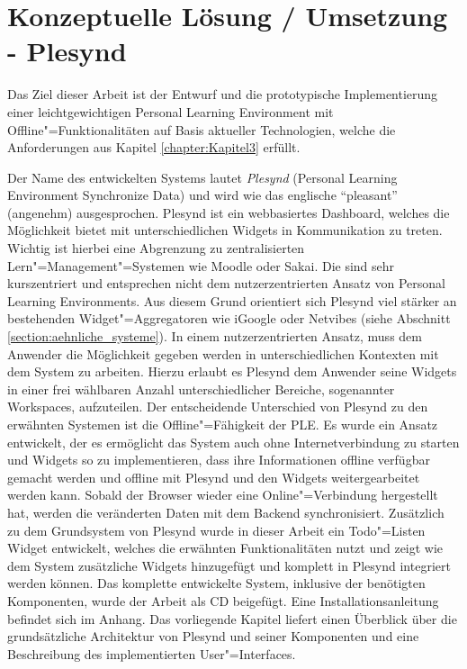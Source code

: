 \chapter{Konzeptuelle Lösung / Umsetzung - Plesynd}\label{chapter:Kapitel5}

Das Ziel dieser Arbeit ist der Entwurf und die prototypische Implementierung einer leichtgewichtigen Personal Learning Environment mit Offline"=Funktionalitäten auf Basis aktueller Technologien, welche die Anforderungen aus Kapitel \ref{chapter:Kapitel3} erfüllt. 

Der Name des entwickelten Systems lautet \emph{Plesynd} (Personal Learning Environment Synchronize Data) und wird wie das englische "`pleasant"' (angenehm) ausgesprochen. Plesynd ist ein webbasiertes Dashboard, welches die Möglichkeit bietet mit unterschiedlichen Widgets in Kommunikation zu treten. Wichtig ist hierbei eine Abgrenzung zu zentralisierten Lern"=Management"=Systemen wie Moodle oder Sakai. Die sind sehr kurszentriert und entsprechen nicht dem nutzerzentrierten Ansatz von Personal Learning Environments. Aus diesem Grund orientiert sich Plesynd viel stärker an bestehenden Widget"=Aggregatoren wie iGoogle oder Netvibes (siehe Abschnitt \ref{section:aehnliche_systeme}). In einem nutzerzentrierten Ansatz, muss dem Anwender die Möglichkeit gegeben werden in unterschiedlichen Kontexten mit dem System zu arbeiten. Hierzu erlaubt es Plesynd dem Anwender seine Widgets in einer frei wählbaren Anzahl unterschiedlicher Bereiche, sogenannter Workspaces, aufzuteilen. Der entscheidende Unterschied von Plesynd zu den erwähnten Systemen ist die Offline"=Fähigkeit der PLE. Es wurde ein Ansatz entwickelt, der es ermöglicht das System auch ohne Internetverbindung zu starten und Widgets so zu implementieren, dass ihre Informationen offline verfügbar gemacht werden und offline mit Plesynd und den Widgets weitergearbeitet werden kann. Sobald der Browser wieder eine Online"=Verbindung hergestellt hat, werden die veränderten Daten mit dem Backend synchronisiert. Zusätzlich zu dem Grundsystem von Plesynd wurde in dieser Arbeit ein Todo"=Listen Widget entwickelt, welches die erwähnten Funktionalitäten nutzt und zeigt wie dem System zusätzliche Widgets hinzugefügt und komplett in Plesynd integriert werden können. Das komplette entwickelte System, inklusive der benötigten Komponenten, wurde der Arbeit als CD beigefügt. Eine Installationsanleitung befindet sich im Anhang. Das vorliegende Kapitel liefert einen Überblick über die grundsätzliche Architektur von Plesynd und seiner Komponenten und eine Beschreibung des implementierten User"=Interfaces.
